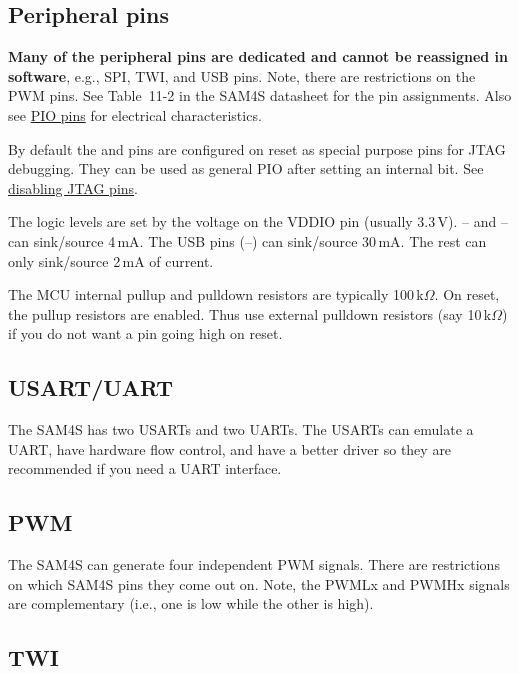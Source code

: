 \subsection{Peripheral pins}\label{peripheral-pins}

\textbf{Many of the peripheral pins are dedicated and cannot be
  reassigned in software}, e.g., SPI, TWI, and USB pins. Note, there
are restrictions on the PWM pins.  See Table~11-2 in the SAM4S
datasheet for the pin assignments.  Also see \hyperref[PIO pins]{PIO
  pins} for electrical characteristics.

By default the  and  pins are configured on reset as
special purpose pins for JTAG debugging.  They can be used as general
PIO after setting an internal bit.  See
\protect\hyperref[disabling-jtag-pins]{disabling JTAG pins}.

The logic levels are set by the voltage on the VDDIO pin (usually
3.3\,V).  -- and -- can
sink/source 4\,mA.  The USB pins (--) can
sink/source 30\,mA.  The rest can only sink/source 2\,mA of current.

The MCU internal pullup and pulldown resistors are typically
100\,k$\Omega$.  On reset, the pullup resistors are enabled.  Thus use
external pulldown resistors (say 10\,k$\Omega$) if you do not want a
pin going high on reset.


\subsection{USART/UART}\label{usartuart}

The SAM4S has two USARTs and two UARTs. The USARTs can emulate a
UART, have hardware flow control, and have a better driver so they are
recommended if you need a UART interface.


\subsection{PWM}\label{pwm}

The SAM4S can generate four independent PWM signals. There are
restrictions on which SAM4S pins they come out on. Note, the PWMLx and
PWMHx signals are complementary (i.e., one is low while the other is
high).

\subsection{TWI}\label{twi}

